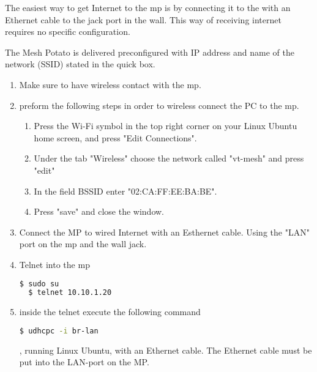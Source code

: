 
The easiest way to get Internet to the \gls{mp} is by connecting it to the with an Ethernet cable to the jack port in the wall. This way of receiving internet requires no specific configuration. 

The Mesh Potato is delivered preconfigured with IP address and name of the network (SSID) stated in the \gls{quick} box.

\begin{enumerate}
\item Make sure to have wireless contact with the \gls{mp}.

\item preform the following steps in order to wireless connect the PC to the \gls{mp}.
\begin{enumerate}
\item Press the Wi-Fi symbol in the top right corner on your Linux Ubuntu home screen, and press "Edit Connections".
\item  Under the tab "Wireless" choose the network called "vt-mesh" and press "edit"
\item In the field BSSID enter "02:CA:FF:EE:BA:BE".
\item Press "save" and close the window. 
\end{enumerate}

 

\item Connect the MP to wired Internet with an Esthernet cable. Using the "LAN" port on the \gls{mp} and the wall jack. 

\item Telnet into the \gls{mp}
\noindent
\begin{lstlisting}[language=bash]
  $ sudo su
  $ telnet 10.10.1.20
\end{lstlisting}

\item inside the telnet execute the following command
\noindent
\begin{lstlisting}[language=bash]
  $ udhcpc -i br-lan
\end{lstlisting}















, running Linux Ubuntu, with an Ethernet cable. The Ethernet cable must be put into the LAN-port on the MP. 


\end{enumerate}
